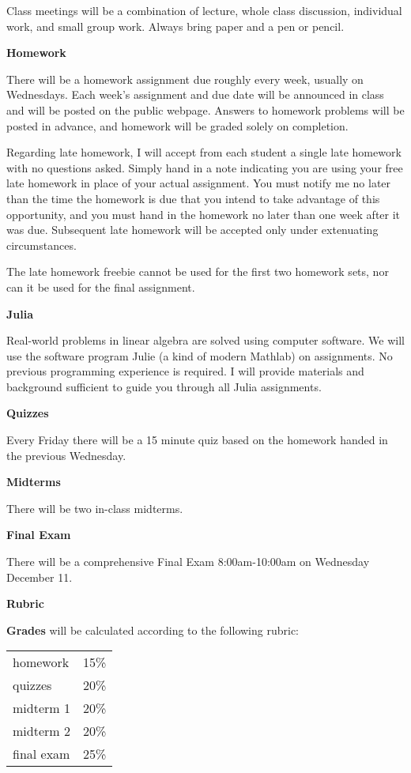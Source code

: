 \documentclass[12pt]{article}
\begin{document}
Class meetings will be a combination of lecture, whole class discussion, individual work, and small group work. Always bring paper and a pen or pencil. 

{\textbf{\large{Homework}}}

There will be a homework assignment due roughly every week, usually on Wednesdays. Each week’s assignment and due date will be announced in class and will be posted on the public webpage. Answers to homework problems will be posted in advance, and homework will be graded solely on completion.

Regarding late homework, I will accept from each student a single late homework with no
questions asked. Simply hand in a note indicating you are using your free late homework in
place of your actual assignment. You must notify me no later than the time the homework is
due that you intend to take advantage of this opportunity, and you must hand in the homework no later than one week after it was due. Subsequent late homework will be accepted only under extenuating circumstances.

The late homework freebie cannot be used for the first two homework sets, nor can it be used for the final assignment.

{\textbf{\large{Julia}}}

Real-world problems in linear algebra are solved using computer software. We will use the software program Julie (a kind of modern Mathlab) on assignments. No previous programming experience is required. I will provide materials and background sufficient to guide you through all Julia assignments.

{\textbf{\large{Quizzes}}}

Every Friday there will be a 15 minute quiz based on the homework handed in the previous Wednesday.

%

{\textbf{\large{Midterms}}}

There will be two in-class midterms.

{\textbf{\large{Final Exam}}}

There will be a comprehensive Final Exam 8:00am-10:00am on Wednesday December 11.

{\textbf{\large{Rubric}}}

\begin{multicols}{2}
\textbf{Grades} will be calculated according to the following rubric:


\begin{tabular}{|l|c|}
  \hline
  homework & 15\% \\
  quizzes & 20\%\\
  midterm 1 & 20\%\\
  midterm 2 & 20\%\\
  final exam & 25\% \\
  \hline
\end{tabular}
\end{multicols}
\end{document}
